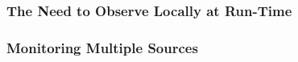 


%

\subsubsection{The Need to Observe Locally at Run-Time}
%
%
%

\subsubsection{Monitoring Multiple Sources}
%

